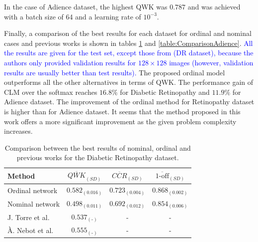 \documentclass[journal]{IEEEtran}
\begin{document}
	In the case of Adience dataset, the highest QWK was $0.787$ and was achieved with a batch size of 64 and a learning rate of $10^{-3}$.

	Finally, a comparison of the best results for each dataset for ordinal and nominal cases and previous works is shown in tables \ref{table:ComparisonDR} and \ref{table:ComparisonAdience}. \textcolor{blue}{All the results are given for the test set, except those from \cite{de2018weighted} (DR dataset), because the authors only provided validation results for $128\times 128$ images (however, validation results are usually better than test results).} The proposed ordinal model outperforms all the other alternatives in terms of QWK. The performance gain of CLM over the softmax reaches $16.8\%$ for Diabetic Retinopathy and $11.9\%$ for Adience dataset. The improvement of the ordinal method for Retinopathy dataset is higher than for Adience dataset. It seems that the method proposed in this work offers a more significant improvement as the given problem complexity increases.
	
	
	\begin{table}[!t]
		\caption{Comparison between the best results of nominal, ordinal and previous works for the Diabetic Retinopathy dataset.}
		\label{table:ComparisonDR}
		\scriptsize
		\centering
		\def\arraystretch{1.3}
		\begin{tabular}{lccc}
			\hline
			\hline
			Method                                   & $\overline{QWK}_{(SD)}$ & $\overline{CCR}_{(SD)}$ & $\overline{\text{1-off}}_{(SD)}$ \\ \hline
			Ordinal network                          &    $0.582_{(0.016)}$    &    $0.723_{(0.004)}$    &        $0.868_{(0.002)}$         \\
			Nominal network                          &    $0.498_{(0.011)}$    &    $0.692_{(0.012)}$    &        $0.854_{(0.006)}$         \\
			J. Torre et al. \cite{de2018weighted}    &  $0.537_{(\text{-})}$   &            -            &                -                 \\
			À. Nebot et al. \cite{nebot2016diabetic} &  $0.555_{(\text{-})}$   &            -            &                -					\\
			\hline
			\hline
		\end{tabular}
	\end{table}
	
\end{document}
